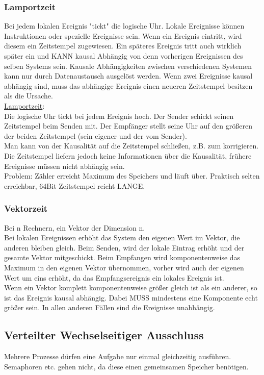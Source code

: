 \documentclass[a4paper]{article}
\begin{document}
\subsubsection{Lamportzeit}
Bei jedem lokalen Ereignis "tickt" die logische Uhr. Lokale Ereignisse können Instruktionen oder spezielle Ereignisse sein. Wenn ein Ereignis eintritt, wird diesem ein Zeitstempel zugewiesen. Ein späteres Ereignis tritt auch wirklich später ein und KANN kausal Abhängig von denn vorherigen Ereignissen des selben Systems sein. Kausale Abhängigkeiten zwischen verschiedenen Systemen kann nur durch Datenaustausch ausgelöst werden. Wenn zwei Ereignisse kausal abhängig sind, muss das abhängige Ereignis einen neueren Zeitstempel besitzen als die Ursache.\\
\underline{Lamportzeit}:\\
Die logische Uhr tickt bei jedem Ereignis hoch. Der Sender schickt seinen Zeitstempel beim Senden mit. Der Empfänger stellt seine Uhr auf den größeren der beiden Zeitstempel (sein eigener und der vom Sender). \\
Man kann von der Kausalität auf die Zeitstempel schließen, z.B. zum korrigieren. Die Zeitstempel liefern jedoch keine Informationen über die Kausalität, frühere Ereignisse müssen nicht abhängig sein.\\
Problem: Zähler erreicht Maximum des Speichers und läuft über. Praktisch selten erreichbar, 64Bit Zeitstempel reicht LANGE.\\
\subsubsection{Vektorzeit}
Bei n Rechnern, ein Vektor der Dimension n.\\
Bei lokalen Ereignissen erhöht das System den eigenen Wert im Vektor, die anderen bleiben gleich. Beim Senden, wird der lokale Eintrag erhöht und der gesamte Vektor mitgeschickt. Beim Empfangen wird komponentenweise das Maximum in den eigenen Vektor übernommen, vorher wird auch der eigenen Wert um eins erhöht, da das Empfangsereignis ein lokales Ereignis ist.\\
Wenn ein Vektor komplett komponentenweise größer gleich ist als ein anderer, so ist das Ereignis kausal abhängig. Dabei MUSS mindestens eine Komponente echt größer sein. In allen anderen Fällen sind die Ereignisse unabhängig.\\
\subsection{Verteilter Wechselseitiger Ausschluss}
Mehrere Prozesse dürfen eine Aufgabe nur einmal gleichzeitig ausführen.\\
Semaphoren etc. gehen nicht, da diese einen gemeinsamen Speicher benötigen.\\
\end{document}
